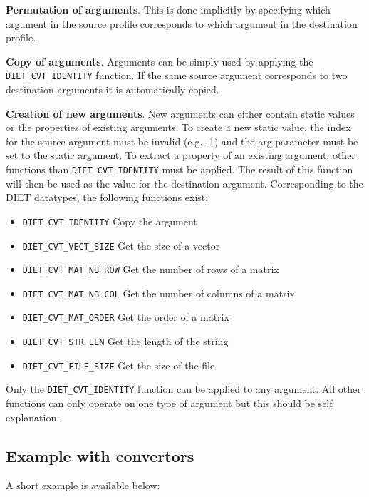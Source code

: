 {{\begin{description}
\item{\textbf{Permutation of arguments}}. This is done implicitly by specifying which
  argument in the source profile corresponds to which argument in the
  destination profile.
\item{\textbf{Copy of arguments}}. Arguments can be simply used by applying the
  \texttt{DIET\_CVT\_IDENTITY} function. If the same source argument
  corresponds to two destination arguments it is automatically copied.
\item{\textbf{Creation of new arguments}}. New arguments can either contain static
  values or the properties of existing arguments. To create a new static
  value, the index for the source argument must be invalid (e.g. -1) and
  the arg parameter must be set to the static argument. To extract a
  property of an existing argument, other functions than
  \texttt{DIET\_CVT\_IDENTITY} must be applied. The result of this function
  will then be used as the value for the destination argument.
  Corresponding to
  the DIET datatypes, the following functions exist: \\
\begin{itemize}
\item{\texttt{DIET\_CVT\_IDENTITY}} Copy the argument
\item{\texttt{DIET\_CVT\_VECT\_SIZE}} Get the size of a vector
\item{\texttt{DIET\_CVT\_MAT\_NB\_ROW}} Get the number of rows of a matrix
\item{\texttt{DIET\_CVT\_MAT\_NB\_COL}} Get the number of columns of a matrix
\item{\texttt{DIET\_CVT\_MAT\_ORDER}} Get the order of a matrix
\item{\texttt{DIET\_CVT\_STR\_LEN}} Get the length of the string
\item{\texttt{DIET\_CVT\_FILE\_SIZE}} Get the size of the file
\end{itemize}
Only the \texttt{DIET\_CVT\_IDENTITY} function can be applied to any argument.
All other functions can only operate on one type of argument but this
should be self explanation.

\end{description}

\subsection{Example with convertors}

\noindent A short example is available below:
\footnotesize
\begin{verbatim}


\end{verbatim}}}
